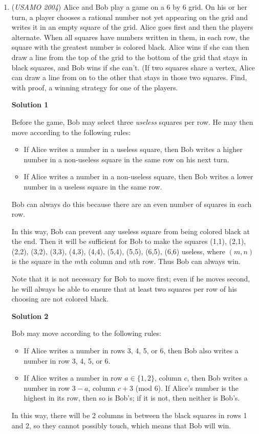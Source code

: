 \begin{enumerate}
 \textbf{Resources} 


	\item (\textit{USAMO 2004}) Alice and Bob play a game on a 6 by 6 grid.  On his or her turn, a player chooses a rational number not yet appearing on the grid and writes it in an empty square of the grid.  Alice goes first and then the players alternate.  When all squares have numbers written in them, in each row, the square with the greatest number is colored black.  Alice wins if she can then draw a line from the top of the grid to the bottom of the grid that stays in black squares, and Bob wins if she can't.  (If two squares share a vertex, Alice can draw a line from on to the other that stays in those two squares.  Find, with proof, a winning strategy for one of the players.


 



\textbf{Solution 1}

Before the game, Bob may select three \textit{useless} squares per row.  He may then move according to the following rules:

 
            \begin{itemize}
        \item If Alice writes a number in a useless square, then Bob writes a higher number in a non-useless square in the same row on his next turn.
        \item If Alice writes a number in a non-useless square, then Bob writes a lower number in a useless square in the same row.
            \end{itemize}
            Bob can always do this because there are an even number of squares in each row.

 In this way, Bob can prevent any useless square from being colored black at the end.  Then it will be sufficient for Bob to make the squares (1,1), (2,1), (2,2), (3,2), (3,3), (4,3), (4,4), (5,4), (5,5), (6,5), (6,6) useless, where $(m,n)$ is the square in the $m$th column and $n$th row.  Thus Bob can always win.

 Note that it is not necessary for Bob to move first; even if he moves second, he will always be able to ensure that at least two squares per row of his choosing are not colored black.

 



\textbf{Solution 2}

Bob may move according to the following rules:

 
            \begin{itemize}
        \item If Alice writes a number in rows 3, 4, 5, or 6, then Bob also writes a number in row 3, 4, 5, or 6.
        \item If Alice writes a number in row $a \in \{ 1, 2 \}$, column $c$, then Bob writes a number in row $3 - a$, column $c + 3$ (mod 6).  If Alice's number is the highest in its row, then so is Bob's; if it is not, then neither is Bob's.
            \end{itemize}
            In this way, there will be 2 columns in between the black squares in rows 1 and 2, so they cannot possibly touch, which means that Bob will win.


\end{enumerate}
